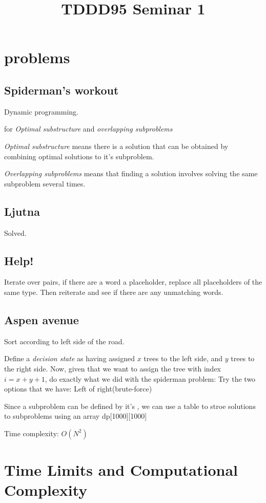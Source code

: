 \documentclass{article}
\title{TDDD95 \- Seminar 1}
\begin{document}
\maketitle{}

\section{problems}
\subsection{Spiderman's workout}

Dynamic programming.

for \emph{Optimal substructure} and \emph{overlapping subproblems}

\emph{Optimal substructure} \- means there is a solution that can be obtained by combining
optimal solutions to it's subproblem.

\emph{Overlapping subproblems} \- means that finding a solution involves solving the same
subproblem several times.

\subsection{Ljutna}
Solved.

\subsection{Help!}
Iterate over pairs, if there are a word a placeholder, replace all placeholders
of the same type. Then reiterate and see if there are any unmatching words.

\subsection{Aspen avenue}
Sort according to left side of the road.

Define a \emph{decision state} as having assigned $x$ trees to the left side,
and $y$ trees to the right side. Now, given that we want to assign the tree with
index $i=x+y+1$, do exactly what we did with the spiderman problem: Try the two
options that we have: Left of right(brute-force)

Since a subproblem can be defined by it's , we can use a
table to stroe solutions to subproblems using an array dp[1000][1000]

Time complexity: $O(N^2)$

\section{Time Limits and Computational Complexity}
\end{document}
